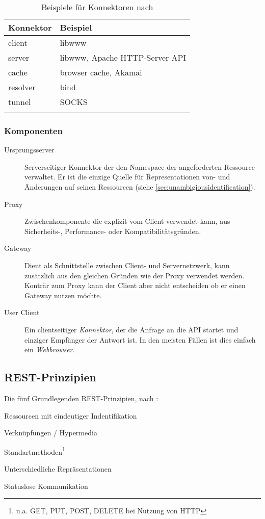 \begin{longtable}[htb]{l l}
    \toprule
    \rowcolor{lightgray}
    \textbf{Konnektor}   & \textbf{Beispiel}\\
    \midrule
    client      & libwww\\
    server      & libwww, Apache HTTP-Server API\\
    cache       & browser cache, Akamai\\
    resolver    & bind\\
    tunnel      & SOCKS\\
    \bottomrule
    \caption{Beispiele für Konnektoren nach \cite{fieldingDissertation}}
    \label{tab:RESTconnectors}
\end{longtable}

\subsubsection{Komponenten}
\label{sec:RESTcomponents}

\begin{description}
    \item[Ursprungsserver] 
        Serverseitiger Konnektor der den Namespace der angeforderten Ressource verwaltet. Er ist die einzige Quelle für Representationen von- und Änderungen auf seinen Ressourcen (siehe \cref{sec:unambigiousidentification}).
    \item[Proxy] Zwischenkomponente die explizit vom Client verwendet kann, aus Sicherheits-, Performance- oder Kompatibilitätsgründen.
    \item[Gateway] Dient als Schnittstelle zwischen Client- und Servernetzwerk, kann zusätzlich aus den gleichen Gründen wie der Proxy verwendet werden. Konträr zum Proxy kann der Client aber nicht entscheiden ob er einen Gateway nutzen möchte.
    \item[User Client] 
        Ein clientseitiger \emph{Konnektor}, der die Anfrage an die API startet und einziger Empfänger der Antwort ist. In den meisten Fällen ist dies einfach ein \emph{Webbrowser}.
\end{description}

\subsection{REST-Prinzipien}

Die fünf Grundlegenden REST-Prinzipien, nach \cite[11 ff.]{Tilkov09}:
\begin{compactitem}
    \item Ressourcen mit eindeutiger Indentifikation
    \item Verknüpfungen / Hypermedia
    \item Standartmethoden\footnote{u.a. GET, PUT, POST, DELETE bei Nutzung von HTTP}
    \item Unterschiedliche Repräsentationen
    \item Statuslose Kommunikation
\end{compactitem}


